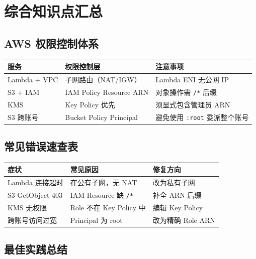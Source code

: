 \documentclass[12pt, a4paper]{article}
\begin{document}
\newpage
\section{综合知识点汇总}

\subsection{AWS 权限控制体系}

\begin{center}
\begin{tabular}{p{3cm}p{4.5cm}p{4.5cm}}
\toprule
\textbf{服务} & \textbf{权限控制层} & \textbf{注意事项} \\
\midrule
Lambda + VPC & 子网路由（NAT/IGW）& Lambda ENI 无公网 IP \\
S3 + IAM & IAM Policy Resource ARN & 对象操作需 \texttt{/*} 后缀 \\
KMS & Key Policy 优先 & 须显式包含管理员 ARN \\
S3 跨账号 & Bucket Policy Principal & 避免使用 \texttt{:root} 委派整个账号 \\
\bottomrule
\end{tabular}
\end{center}

\subsection{常见错误速查表}

\begin{center}
\begin{tabular}{p{4cm}p{4cm}p{4cm}}
\toprule
\textbf{症状} & \textbf{常见原因} & \textbf{修复方向} \\
\midrule
Lambda 连接超时 & 在公有子网，无 NAT & 改为私有子网 \\
S3 GetObject 403 & IAM Resource 缺 \texttt{/*} & 补全 ARN 后缀 \\
KMS 无权限 & Role 不在 Key Policy 中 & 编辑 Key Policy \\
跨账号访问过宽 & Principal 为 root & 改为精确 Role ARN \\
\bottomrule
\end{tabular}
\end{center}

\subsection{最佳实践总结}
\end{document}
